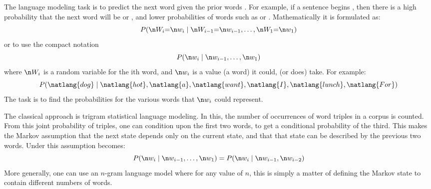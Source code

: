 {

The language modeling task is to predict the next word given the prior words .
For example, if a sentence begins , then there is a high probability that the next word will be  or ,
and lower probabilities of words such as  or .
Mathematically it is formulated as: 
\begin{equation}\label{equ:langmodel}
	P(\n W_i{=}\n w_i \mid \n W_{i-1}{=}\n w_{i-1}, \ldots, \n W_1{=}\n w_1)
\end{equation}
or to use the compact notation 
\begin{equation}\label{equ:langmodelcompact}
P(\n w_i \mid \n w_{i-1}, \ldots, \n w_1)
\end{equation}
where $\n W_i$ is a random variable for the ith word, and $\n w_i$ is a value (a word) it could, (or does) take.
For example: 
\begin{equation*}
P(\natlang{dog} \mid \natlang{hot}, \natlang{a}, \natlang{want}, \natlang{I}, \natlang{lunch}, \natlang{For})
\end{equation*}
The task is to find the probabilities for the various words that $\n w_i$ could represent.


  
The classical approach is trigram statistical language modeling.
In this, the number of occurrences of word triples in a corpus is counted.
From this joint probability of triples, one can condition upon the first two words,
to get a conditional probability of the third.
This makes the Markov assumption that the next state depends only on the current state,
and that that state can be described by the previous two words.
Under this assumption  becomes:
\begin{equation}\label{equ:trigramlangmodel}
P(\n w_i \mid \n w_{i-1}, \ldots, \n w_1) = P(\n w_i \mid \n w_{i-1}, \n w_{i-2})
\end{equation}
More generally, one can use an $n$-gram language model where for any value of $n$,
this is simply a matter of defining the Markov state to contain different numbers of words.

}
